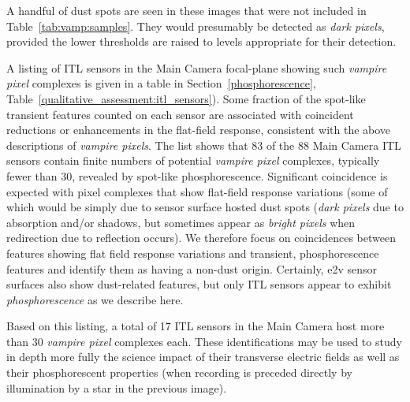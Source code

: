 A handful of dust spots are seen in these images that were not included in Table~\ref{tab:vamp:samples}. They would presumably be detected as {\it dark pixels}, provided the lower thresholds are raised to levels appropriate for their detection.


%
%

A listing of ITL sensors in the Main Camera focal-plane showing such {\it vampire pixel} complexes is given in a table in Section~\ref{phosphorescence}, Table~\ref{qualitative_assessment:itl_sensors}). Some fraction of the spot-like transient features counted on each sensor are associated with coincident reductions or enhancements in the flat-field response, consistent with the above descriptions of {\it vampire pixels}. The list shows that 83 of the 88 Main Camera ITL sensors contain finite numbers of potential {\it vampire pixel} complexes, typically fewer than 30, revealed by spot-like phosphorescence. Significant coincidence is expected with pixel complexes that show flat-field response variations (some of which would be simply due to sensor surface hosted dust spots ({\it dark pixels} due to absorption and/or shadows, but sometimes appear as {\it bright pixels} when redirection due to reflection occurs). We therefore focus on coincidences between features showing flat field response variations and transient, phosphorescence features and identify them as having a non-dust origin. Certainly, e2v sensor surfaces also show dust-related features, but only ITL sensors appear to exhibit {\it phosphorescence} as we describe here.

Based on this listing, a total of 17 ITL sensors in the Main Camera host more than 30 {\it vampire pixel} complexes each. These identifications may be used to study in depth more fully the science impact of their transverse electric fields as well as their phosphorescent properties (when recording is preceded directly by illumination by a star in the previous image).

